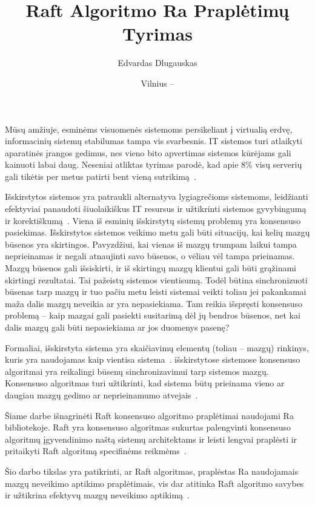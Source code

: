 \documentclass{VUMIFPSkursinis}
\title{Raft Algoritmo Ra Praplėtimų Tyrimas}
\author{Edvardas Dlugauskas}
\date{Vilnius – \the\year}
\begin{document}
\maketitle
\tableofcontents


Mūsų amžiuje, esminėms visuomenės sistemoms persikeliant į virtualią erdvę, informacinių sistemų stabilumas tampa vis svarbesnis. IT sistemos turi atlaikyti aparatinės įrangos gedimus, nes vieno bito apvertimas sistemos kūrėjams gali kainuoti labai daug. Neseniai atliktas tyrimas parodė, kad apie 8\% visų serverių gali tikėtis per metus patirti bent vieną sutrikimą~\cite{characterizing_cloud_hardware_rel}.

Išskirstytos sistemos yra patraukli alternatyva lygiagrečioms sistemoms, leidžianti efektyviai panaudoti šiuolaikiškus IT resursus ir užtikrinti sistemos gyvybingumą ir korektiškumą~\cite{steen_distributed_2017, ongaro_consensus}. Viena iš esminių išskirstytų sistemų problemų yra konsensuso pasiekimas. Išskirstytos sistemos veikimo metu gali būti situacijų, kai kelių mazgų būsenos yra skirtingos. Pavyzdžiui, kai vienas iš mazgų trumpam laikui tampa neprieinamas ir negali atnaujinti savo būsenos, o vėliau vėl tampa prieinamas. Mazgų būsenos gali išsiskirti, ir iš skirtingų mazgų klientui gali būti grąžinami skirtingi rezultatai. Tai pažeistų sistemos vientisumą. Todėl būtina sinchronizuoti būsenas tarp mazgų ir tuo pačiu metu leisti sistemai veikti toliau jei pakankamai maža dalis mazgų neveikia ar yra nepasiekiama. Tam reikia išspręsti konsensuso problemą -- kaip mazgai gali pasiekti susitarimą dėl jų bendros būsenos, net kai dalis mazgų gali būti nepasiekiama ar jos duomenys pasenę?

Formaliai, išskirstyta sistema yra skaičiavimų elementų (toliau -- mazgų) rinkinys, kuris yra naudojamas kaip vientisa sistema~\cite{steen_distributed_2017}. išskirstytose sistemose konsensuso algoritmai yra reikalingi būsenų sinchronizavimui tarp sistemos mazgų. Konsensuso algoritmas turi užtikrinti, kad sistema būtų prieinama vieno ar daugiau mazgų gedimo ar neprieinamumo atvejais~\cite{ongaro_consensus}. 

Šiame darbe išnagrinėti Raft konsensuso algoritmo praplėtimai naudojami Ra bibliotekoje. Raft yra konsensuso algoritmas sukurtas palengvinti konsensuso algoritmų įgyvendinimo naštą sistemų architektams ir leisti lengvai praplėsti ir pritaikyti Raft algoritmą specifinėms reikmėms~\cite{ongaro_consensus}. 

Šio darbo tikslas yra patikrinti, ar Raft algoritmas, praplėstas Ra naudojamais mazgų neveikimo aptikimo praplėtimais, vis dar atitinka Raft algoritmo savybes ir užtikrina efektyvų mazgų neveikimo aptikimą~\cite{ongaro_consensus, rabbitmqra}.
\end{document}
